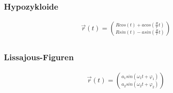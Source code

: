     \subsubsection{Hypozykloide}
    \begin{align*}
        \overrightarrow{r}(t) = \binom{R cos(t) + a cos(\frac{R}{r} t)}{R sin(t) - a sin(\frac{R}{r} t)}\\
    \end{align*}

    \subsubsection{Lissajous-Figuren}
    \begin{align*}
        \overrightarrow{r}(t) = \binom{a_1 sin(\omega_1 t + \varphi_1)}{a_2 sin(\omega_2 t + \varphi_2)}
    \end{align*}